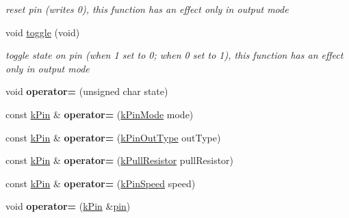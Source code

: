 \begin{DoxyCompactItemize}
\begin{DoxyCompactList}\small\item\em reset pin (writes 0), this function has an effect only in output mode \end{DoxyCompactList}\item 
void \hyperlink{classkPin_af4c6220ae2ed038236d729f867940938}{toggle} (void)\hypertarget{classkPin_af4c6220ae2ed038236d729f867940938}{}\label{classkPin_af4c6220ae2ed038236d729f867940938}

\begin{DoxyCompactList}\small\item\em toggle state on pin (when 1 set to 0; when 0 set to 1), this function has an effect only in output mode \end{DoxyCompactList}\item 
void {\bfseries operator=} (unsigned char state)\hypertarget{classkPin_a3c4330824805701cbcb52431b187f643}{}\label{classkPin_a3c4330824805701cbcb52431b187f643}

\item 
const \hyperlink{classkPin}{k\+Pin} \& {\bfseries operator=} (\hyperlink{classkPin_a311ea70432d9c48754eacc8d8ce8a949}{k\+Pin\+Mode} mode)\hypertarget{classkPin_aaaad528a43da36662f4361d13419b0c0}{}\label{classkPin_aaaad528a43da36662f4361d13419b0c0}

\item 
const \hyperlink{classkPin}{k\+Pin} \& {\bfseries operator=} (\hyperlink{classkPin_a5aa9350fb0a7617a568344d8a074837f}{k\+Pin\+Out\+Type} out\+Type)\hypertarget{classkPin_a32d7ae0a031264b9f47a8c691ae16a1e}{}\label{classkPin_a32d7ae0a031264b9f47a8c691ae16a1e}

\item 
const \hyperlink{classkPin}{k\+Pin} \& {\bfseries operator=} (\hyperlink{classkPin_a4d00e25b986e7851957a68deb1c91b18}{k\+Pull\+Resistor} pull\+Resistor)\hypertarget{classkPin_af5fd9228e54385316b644f190c6f5dfc}{}\label{classkPin_af5fd9228e54385316b644f190c6f5dfc}

\item 
const \hyperlink{classkPin}{k\+Pin} \& {\bfseries operator=} (\hyperlink{classkPin_a93c5cec6b9b90fda782cfa847eacdb8b}{k\+Pin\+Speed} speed)\hypertarget{classkPin_a91238da7b4019164f8205f8a3219628d}{}\label{classkPin_a91238da7b4019164f8205f8a3219628d}

\item 
void {\bfseries operator=} (\hyperlink{classkPin}{k\+Pin} \&\hyperlink{classkPin_a0da283781fc832c77419bc71ff356cc1}{pin})\hypertarget{classkPin_aef0f51fbe34f5a0c05cb98669e80dc4f}{}\label{classkPin_aef0f51fbe34f5a0c05cb98669e80dc4f}


\end{DoxyCompactItemize}
